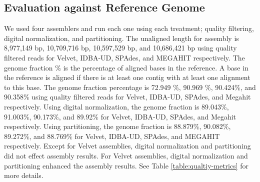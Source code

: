 \subsection*{Evaluation against Reference Genome}   

We used four assemblers and run each one using each treatment; quality
filtering, digital normalization, and partitioning.  The unaligned
length for assembly is 8,977,149 bp, 10,709,716 bp, 10,597,529 bp, and
10,686,421 bp using quality filtered reads for Velvet, IDBA-UD, SPAdes,
and MEGAHIT respectively.  The genome fraction \% is the percentage of
aligned bases in the reference. A base in the reference is aligned if
there is at least one contig with at least one alignment to this base.
The genome fraction percentage is 72.949 \%, 90.969 \%, 90.424\%, and
90.358\% using quality filtered reads for Velvet, IDBA-UD, SPAdes, and
Megahit respectively.  Using digital normalization, the genome
fraction is 89.043\%, 91.003\%, 90.173\%, and 89.92\% for Velvet,
IDBA-UD, SPAdes, and Megahit respectively.  Using partitioning, the
genome fraction is 88.879\%, 90.082\%, 89.272\%, and 88.769\% for
Velvet, IDBA-UD, SPAdes, and MEGAHIT respectively.  Except for Velvet assemblies, digital
normalization and partitioning did not effect assembly results. For Velvet assemblies, digital normalization and partitioning enhanced the assembly results. See
Table \ref{table:qualtiy-metrics} for more details.





